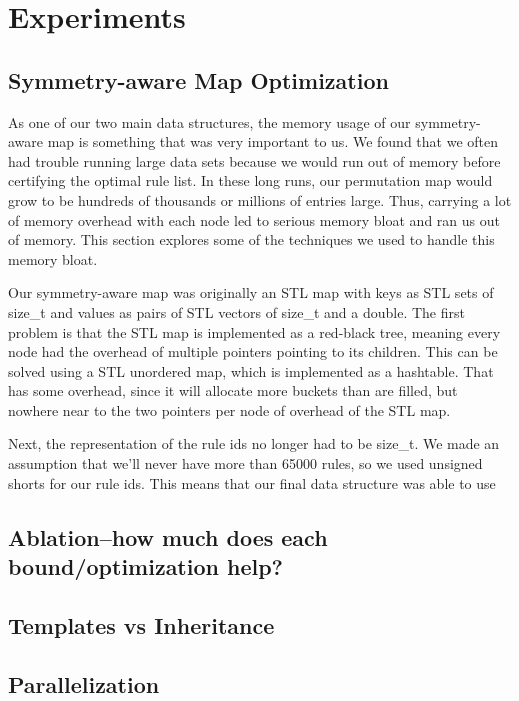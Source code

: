 \chapter{Experiments}
\section{Symmetry-aware Map Optimization}
As one of our two main data structures, the memory usage of our symmetry-aware map is something that was very important to us.
We found that we often had trouble running large data sets because we would run out of memory before certifying the optimal rule list.
In these long runs, our permutation map would grow to be hundreds of thousands or millions of entries large.
Thus, carrying a lot of memory overhead with each node led to serious memory bloat and ran us out of memory.
This section explores some of the techniques we used to handle this memory bloat.

Our symmetry-aware map was originally an STL map with keys as STL sets of size_t and values as pairs of STL vectors of size_t and a double.
The first problem is that the STL map is implemented as a red-black tree, meaning every node had the overhead of multiple pointers pointing to its children.
This can be solved using a STL unordered map, which is implemented as a hashtable.
That has some overhead, since it will allocate more buckets than are filled, but nowhere near to the two pointers per node of overhead of the STL map.

Next, the representation of the rule ids no longer had to be size_t.
We made an assumption that we'll never have more than 65000 rules, so we used unsigned shorts for our rule ids. This means that our final data structure was able to use 


\section{Ablation--how much does each bound/optimization help?}

\section{Templates vs Inheritance}

\section{Parallelization}